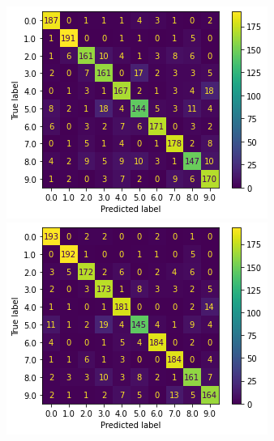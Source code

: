 \documentclass{article}
\begin{document}
\begin{figure}[!htb]
  \includegraphics[width=\linewidth]{figure/svm_cm.png}
\endminipage\hfill
{}
  \includegraphics[width=\linewidth]{figure/svm_pca_cm.png}
\endminipage\hfill
{}

\end{figure}
\end{document}
